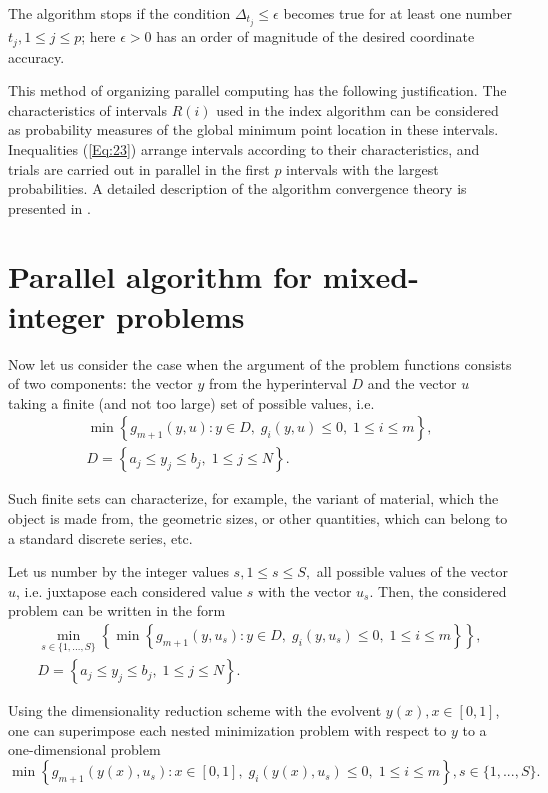 \documentclass{llncs}
\begin{document}
The algorithm stops if the condition $\Delta_{t_j}\leq \epsilon$ becomes true for at least one 
number $t_j, 1\leq j \leq p$; here  $\epsilon>0$ has an order of magnitude of the desired 
coordinate accuracy.

This method of organizing parallel computing has the following justification.
The characteristics of intervals $R(i)$ used in the index algorithm can be considered as
probability measures of the global minimum point location in these intervals. Inequalities
(\ref{Eq:23}) arrange intervals according to their characteristics, and trials are carried out in parallel in
the first $p$ intervals with the largest probabilities.
A detailed description of the algorithm convergence theory is presented in \cite{Strongin2000}.

\section{Parallel algorithm for mixed-integer problems}
Now let us consider the case when the argument of the problem functions consists of two 
components: the vector $y$ from the hyperinterval $D$ and the vector $u$ taking a finite 
(and not too large) set of possible values, i.e. 
\begin{gather}\label{problem_i}
\min{\left\{ g_{m+1}(y,u):y\in D, \; g_i(y,u)\leq 0, \; 1 \leq i \leq m\right\}},\\
D=\left\{a_j\leq y_j \leq b_j, \; 1\leq j \leq N \right\}.\nonumber
\end{gather}

Such finite sets can characterize, for example, the variant of material, which the object is made 
from, the geometric sizes, or other quantities, which can belong to a standard discrete series, etc. 

Let us number by the integer values $s, 1\leq s \leq S,$ all possible values of the vector $u$, i.e. 
juxtapose each considered value $s$ with the vector $u_s$. 
Then, the considered problem can be written in the form 
\begin{gather}\label{problem_is}
 \min_{s\in\{1,...,S\}} \left\{ \min_{}{\left\{ g_{m+1}(y,u_s):y\in D, \; g_i(y,u_s)\leq 0, \; 1 \leq i \leq 
m\right\}}\right\},\\
D=\left\{ a_j\leq y_j \leq b_j, \; 1 \leq j\leq N \right\}.\nonumber 
\end{gather}

Using the dimensionality reduction scheme with the evolvent $y(x), x\in [0,1]$, one can 
superimpose each nested minimization problem with respect to $y$ to a one-dimensional 
problem 
\[
 \min{\left\{ g_{m+1}(y(x),u_s):x \in [0,1], \; g_i(y(x),u_s)\leq 0, \; 1 \leq i \leq m\right\}}, 
s\in\{1,...,S\}.
\]
\end{document}
